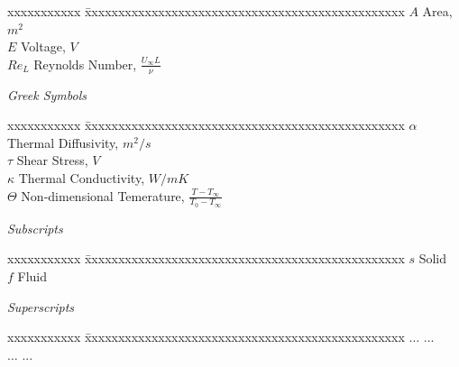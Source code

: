 \documentclass[BTech]{cetlyproj}
\begin{document}
\begin{singlespace}
\begin{tabbing}
xxxxxxxxxxx \= xxxxxxxxxxxxxxxxxxxxxxxxxxxxxxxxxxxxxxxxxxxxxxxx \kill
\textbf{$A$}  \> Area, $m^2$ \\
\textbf{$E$}  \> Voltage, $V$ \\
\textbf{$Re_L$}   \> Reynolds Number, $\frac{U_{\infty}L}{\nu}$\\
\end{tabbing}
\end{singlespace}
\vspace{-4ex}
\noindent \emph{Greek Symbols}
\vspace{-6ex}
\begin{singlespace}
\begin{tabbing}
xxxxxxxxxxx \= xxxxxxxxxxxxxxxxxxxxxxxxxxxxxxxxxxxxxxxxxxxxxxxx \kill
\textbf{$\alpha$}  \> Thermal Diffusivity, $m^2/s$ \\
\textbf{$\tau$}  \> Shear Stress, $V$ \\
\textbf{$\kappa$}   \> Thermal Conductivity, $W/mK$\\
\textbf{$\Theta$}   \> Non-dimensional Temerature, $\frac{T-T_{\infty}}{T_0-T_{\infty}} $\\
\end{tabbing}
\end{singlespace}
\vspace{-4ex}
\noindent \emph{Subscripts}
\vspace{-6ex}
\begin{singlespace}
\begin{tabbing}
xxxxxxxxxxx \= xxxxxxxxxxxxxxxxxxxxxxxxxxxxxxxxxxxxxxxxxxxxxxxx \kill
\textbf{$s$}  \> Solid \\
\textbf{$f$}  \> Fluid \\
\end{tabbing}
\end{singlespace}
\vspace{-4ex}
\noindent \emph{Superscripts}
\vspace{-6ex}
\begin{singlespace}
\begin{tabbing}
xxxxxxxxxxx \= xxxxxxxxxxxxxxxxxxxxxxxxxxxxxxxxxxxxxxxxxxxxxxxx \kill
\textbf{$\dots$}  \> ... \\
\textbf{$\dots$}  \> ... \\
\end{tabbing}
\end{singlespace}


\pagebreak
\clearpage
\end{document}
